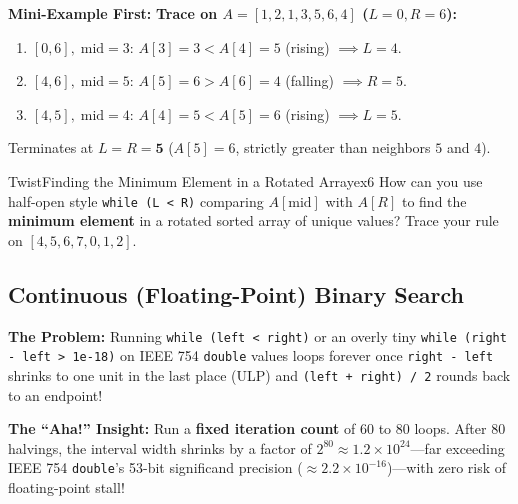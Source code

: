 \documentclass[11pt,a4paper]{article}
\theoremstyle{definition}
\newcommand{\painbeat}{\textbf{\color{accentamber}The Problem:} }
\newcommand{\ahabeat}{\textbf{\color{accentteal}The ``Aha!'' Insight:} }
\newcommand{\examplebeat}{\textbf{\color{primaryblue}Mini-Example First:} }
\begin{document}
\examplebeat \textbf{Trace on $A = [1, 2, 1, 3, 5, 6, 4]$ ($L = 0, R = 6$):}
\begin{enumerate}
    \item $[0, 6],\; \text{mid} = 3$: $A[3] = 3 < A[4] = 5$ (rising) $\implies L = 4$.
    \item $[4, 6],\; \text{mid} = 5$: $A[5] = 6 > A[6] = 4$ (falling) $\implies R = 5$.
    \item $[4, 5],\; \text{mid} = 4$: $A[4] = 5 < A[5] = 6$ (rising) $\implies L = 5$.
\end{enumerate}
Terminates at $L = R = \mathbf{5}$ ($A[5] = 6$, strictly greater than neighbors $5$ and $4$).

\begin{tryitbox}{Twist}{Finding the Minimum Element in a Rotated Array}{ex6}
How can you use half-open style \texttt{while (L < R)} comparing $A[\text{mid}]$ with $A[R]$ to find the \textbf{minimum element} in a rotated sorted array of unique values? Trace your rule on $[4, 5, 6, 7, 0, 1, 2]$.
\end{tryitbox}

\subsection{Continuous (Floating-Point) Binary Search}

\painbeat Running \texttt{while (left < right)} or an overly tiny \texttt{while (right - left > 1e-18)} on IEEE 754 \texttt{double} values loops forever once \texttt{right - left} shrinks to one unit in the last place (ULP) and \texttt{(left + right) / 2} rounds back to an endpoint!

\ahabeat Run a \textbf{fixed iteration count} of $60$ to $80$ loops. After $80$ halvings, the interval width shrinks by a factor of $2^{80} \approx 1.2 \times 10^{24}$---far exceeding IEEE 754 \texttt{double}'s 53-bit significand precision ($\approx 2.2 \times 10^{-16}$)---with zero risk of floating-point stall!
\end{document}

